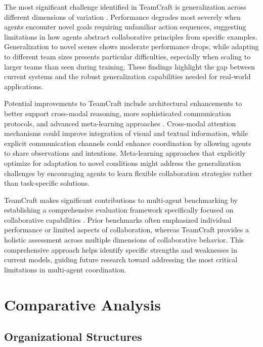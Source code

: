\documentclass[a4paper, 12pt]{article}
\begin{document}
The most significant challenge identified in TeamCraft is generalization across different dimensions of variation \autocite{long2024teamcraftbenchmarkmultimodalmultiagent}. Performance degrades most severely when agents encounter novel goals requiring unfamiliar action sequences, suggesting limitations in how agents abstract collaborative principles from specific examples. Generalization to novel scenes shows moderate performance drops, while adapting to different team sizes presents particular difficulties, especially when scaling to larger teams than seen during training. These findings highlight the gap between current systems and the robust generalization capabilities needed for real-world applications.

Potential improvements to TeamCraft include architectural enhancements to better support cross-modal reasoning, more sophisticated communication protocols, and advanced meta-learning approaches \autocite{long2024teamcraftbenchmarkmultimodalmultiagent}. Cross-modal attention mechanisms could improve integration of visual and textual information, while explicit communication channels could enhance coordination by allowing agents to share observations and intentions. Meta-learning approaches that explicitly optimize for adaptation to novel conditions might address the generalization challenges by encouraging agents to learn flexible collaboration strategies rather than task-specific solutions.

TeamCraft makes significant contributions to multi-agent benchmarking by establishing a comprehensive evaluation framework specifically focused on collaborative capabilities \autocite{long2024teamcraftbenchmarkmultimodalmultiagent}. Prior benchmarks often emphasized individual performance or limited aspects of collaboration, whereas TeamCraft provides a holistic assessment across multiple dimensions of collaborative behavior. This comprehensive approach helps identify specific strengths and weaknesses in current models, guiding future research toward addressing the most critical limitations in multi-agent coordination.

\section{Comparative Analysis}

\subsection{Organizational Structures}
\end{document}
